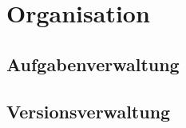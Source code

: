 \section{Organisation}
\label{cha:Organisation}

\subsection{Aufgabenverwaltung}
\label{sec:aufgabenverwaltung}


\subsection{Versionsverwaltung}
\label{sec:versionsverwaltung}
